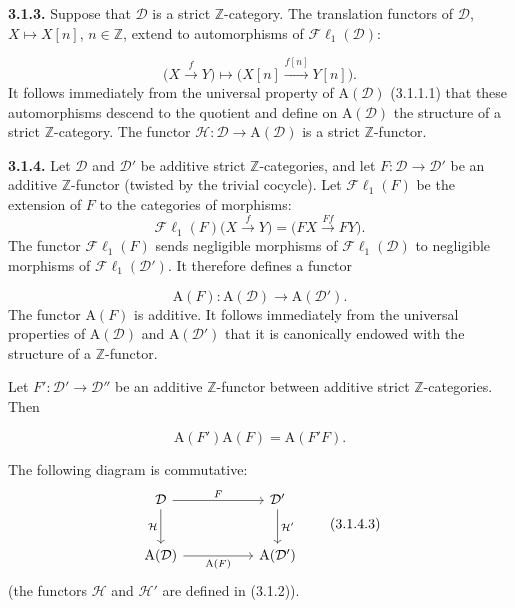\clearpage
{}%
\begingroup
\small
\setlength{\parskip}{0pt}%
\setlength{\emergencystretch}{1.5em}%

\noindent\textbf{3.1.3.}\quad
Suppose that $\mathcal D$ is a strict $\mathbb Z$-category. The translation
functors of $\mathcal D$, $X\longmapsto X[n]$, $n\in\mathbb Z$, extend to
automorphisms of $\mathcal{F}\ell_1(\mathcal D)$:

\[
\bigl(X\xrightarrow{f}Y\bigr)
\longmapsto
\bigl(X[n]\xrightarrow{f[n]}Y[n]\bigr).
\]
It follows immediately from the universal property of
$\mathrm A(\mathcal D)$ (3.1.1.1) that these automorphisms descend to the
quotient and define on $\mathrm A(\mathcal D)$ the structure of a strict
$\mathbb Z$-category. The functor
$\mathcal H\colon\mathcal D\to\mathrm A(\mathcal D)$ is a strict
$\mathbb Z$-functor.

\medskip
\noindent\textbf{3.1.4.}\quad
Let $\mathcal D$ and $\mathcal D'$ be additive strict $\mathbb Z$-categories,
and let $F\colon\mathcal D\to\mathcal D'$ be an additive $\mathbb Z$-functor
(twisted by the trivial cocycle). Let $\mathcal{F}\ell_1(F)$ be the extension
of $F$ to the categories of morphisms:
\[
\mathcal{F}\ell_1(F)\bigl(X\xrightarrow{f}Y\bigr)
=\bigl(FX\xrightarrow{Ff}FY\bigr).
\]
The functor $\mathcal{F}\ell_1(F)$ sends negligible morphisms of
$\mathcal{F}\ell_1(\mathcal D)$ to negligible morphisms of
$\mathcal{F}\ell_1(\mathcal D')$. It therefore defines a functor

\[
\mathrm A(F)\colon\mathrm A(\mathcal D)\longrightarrow\mathrm A(\mathcal D').
\tag{3.1.4.1}
\]
The functor $\mathrm A(F)$ is additive. It follows immediately from the
universal properties of $\mathrm A(\mathcal D)$ and
$\mathrm A(\mathcal D')$ that it is canonically endowed with the structure of
a $\mathbb Z$-functor.

Let $F'\colon\mathcal D'\to\mathcal D''$ be an additive $\mathbb Z$-functor
between additive strict $\mathbb Z$-categories. Then

\[
\mathrm A(F')\mathrm A(F)=\mathrm A(F'F).
\tag{3.1.4.2}
\]

The following diagram is commutative:
\[
\begin{tikzcd}[column sep=5em,row sep=2.5em]
\mathcal D \arrow[r,"F"] \arrow[d,"\mathcal H"'] &
\mathcal D' \arrow[d,"\mathcal H'"] \\
\mathrm A(\mathcal D) \arrow[r,"\mathrm A(F)"'] &
\mathrm A(\mathcal D')
\end{tikzcd}
\tag{3.1.4.3}
\]
(the functors $\mathcal H$ and $\mathcal H'$ are defined in (3.1.2)).

